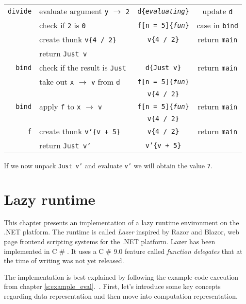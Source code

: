 \documentclass[en]{pracamgr}
\newcommand{\shrp}{%
  {\fontfamily{ppl}\selectfont\#%
  }}
\newcommand{\myref}[1]{\ref{#1}.~\textit{\nameref{#1}}}
\begin{document}
\begin{center}
\begin{tabular}{r | l | c | c }
    \hline
    \texttt{divide} & evaluate argument \texttt{y} $\rightarrow$ \texttt{2} & \texttt{d\{\textit{evaluating}\}} & update \texttt{d} \\
    & check if \texttt{2} is \texttt{0} & \texttt{f[n = 5]\{\textit{fun}\}} & case in \texttt{bind} \\
    & create thunk \texttt{v\{4 / 2\}}& \texttt{v\{4 / 2\}} & return \texttt{main} \\
    & return \texttt{Just v} & & \\
    \hline
    \texttt{bind} & check if the result is \texttt{Just} & \texttt{d\{Just v\}} & return \texttt{main} \\
    & take out \texttt{x} $\rightarrow$ \texttt{v} from \texttt{d} & \texttt{f[n = 5]\{\textit{fun}\}} & \\
    & & \texttt{v\{4 / 2\}} & \\
    \hline
    \texttt{bind} & apply \texttt{f} to \texttt{x} $\rightarrow$ \texttt{v} & \texttt{f[n = 5]\{\textit{fun}\}} & return \texttt{main} \\
    & & \texttt{v\{4 / 2\}} & \\
    \hline
    \texttt{f} & create thunk \texttt{v'\{v + 5\}} & \texttt{v\{4 / 2\}} & return \texttt{main} \\
    & return \texttt{Just v'}& \texttt{v'\{v + 5\}} & \\
    \hline
\end{tabular}
\end{center}

If we now unpack \texttt{Just v'} and evaluate \texttt{v'} we will obtain the value \texttt{7}.


\chapter{Lazy runtime}\label{r:runtime}

This chapter presents an implementation of a lazy runtime environment
on the .NET platform.
The runtime is called \textit{Lazer} inspired by Razor and Blazor,
web page frontend scripting systems for the .NET platform.
Lazer has been implemented in C\shrp{}.
It uses a C\shrp{} 9.0 feature called \textit{function delegates}
that at the time of writing was not yet released.

The implementation is best explained by following the example code execution
from chapter \myref{s:example_eval}.
First, let's introduce some key concepts regarding data representation
and then move into computation representation.
\end{document}
